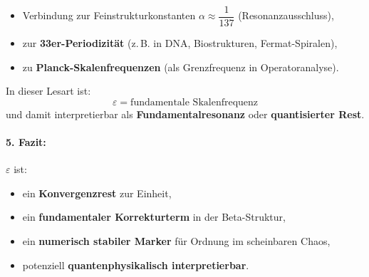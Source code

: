\begin{itemize}
    \item Verbindung zur Feinstrukturkonstanten $\alpha \approx \dfrac{1}{137}$ (Resonanzausschluss),
    \item zur \textbf{33er-Periodizität} (z.\,B. in DNA, Biostrukturen, Fermat-Spiralen),
    \item zu \textbf{Planck-Skalenfrequenzen} (als Grenzfrequenz in Operatoranalyse).
\end{itemize}

In dieser Lesart ist:
\[
\varepsilon = \text{fundamentale Skalenfrequenz}
\]
und damit interpretierbar als \textbf{Fundamentalresonanz} oder \textbf{quantisierter Rest}.

\paragraph{5. Fazit:}
$\varepsilon$ ist:
\begin{itemize}
    \item ein \textbf{Konvergenzrest} zur Einheit,
    \item ein \textbf{fundamentaler Korrekturterm} in der Beta-Struktur,
    \item ein \textbf{numerisch stabiler Marker} für Ordnung im scheinbaren Chaos,
    \item potenziell \textbf{quantenphysikalisch interpretierbar}.
\end{itemize}
